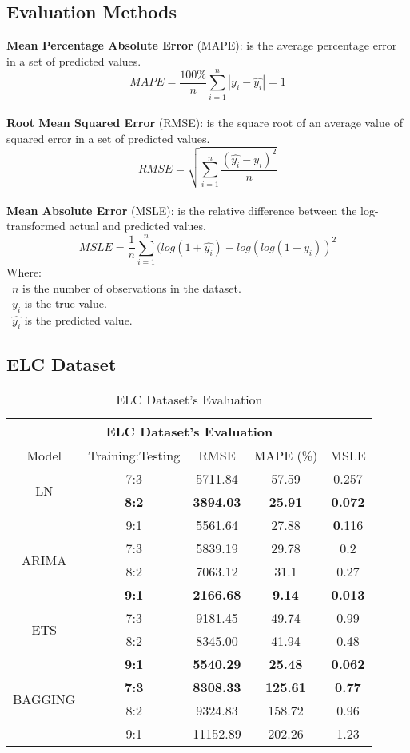 \documentclass{ieeeojies}
\begin{document}
\subsection{Evaluation Methods}
\textbf{Mean Percentage Absolute Error} (MAPE): is the average percentage error in a set of predicted values.\\
\[MAPE=\frac{100\%}{n}  \sum_{i=1}^{n} |y_i-\hat{y_i} |  = 1 \]\\
\textbf{Root Mean Squared Error} (RMSE): is the square root of an average value of squared error in a set of predicted values.\\
\[RMSE=\sqrt{\sum_{i=1}^{n} \frac{(\hat{y_i}-y_i )^2}{n} }\]\\
\textbf{Mean Absolute Error} (MSLE): is the relative difference between the log-transformed actual and predicted values.\\
\[MSLE=\frac{1}{n}\sum_{i=1}^{n}(log(1+\hat{y_i})-log(log(1+y_i))^2\]
Where: \\
	\indent\textbullet\ \(n\) is the number of observations in the dataset.\\
	\indent\textbullet\ \(y_i\)  is the true value.\\
	\indent\textbullet\ \(\hat{y_i}\) is the predicted value.
\subsection{ELC Dataset} 
\begin{table}[H]
    \centering
    \begin{tabular}{|c|c|c|c|c|}
         \hline
         \multicolumn{5}{|c|}{\textbf{ELC Dataset's Evaluation}}\\
         \hline
         \centering Model & Training:Testing & RMSE & MAPE (\%) & MSLE\\
         \hline
         \multirow{2}{*}{LN} & 7:3 & 5711.84 & 57.59 &0.257 \\ & \textbf{8:2} & \textbf{3894.03} & \textbf{25.91} & \textbf{0.072} \\ & 9:1 & 5561.64 & 27.88 & \textbf0.116\\
         \hline
         \multirow{2}{*}{ARIMA} & 7:3 &  5839.19&  29.78 & 0.2 \\ & 8:2 &  7063.12 & 31.1 & 0.27 \\ & \textbf{9:1} & \textbf{2166.68}  & \textbf{9.14} & \textbf{0.013}\\
         \hline
         \multirow{2}{*}{ETS} & 7:3 & 9181.45 & 49.74 & 0.99 \\ & 8:2  &   8345.00 &41.94 & 0.48 \\ & \textbf{9:1} &  	\textbf{5540.29} &	\textbf{25.48} & 	\textbf{0.062} \\
         \hline
         \multirow{2}{*}{BAGGING} & \textbf{7:3} & \textbf{8308.33} & \textbf{125.61} & \textbf{0.77} \\ & 8:2  &   9324.83 &158.72 & 0.96 \\ & 9:1 &  	11152.89 & 202.26 & 1.23 \\
         \hline
    \end{tabular}
    \caption{ELC Dataset's Evaluation}
    \label{vcbresult}
\end{table}
\end{document}
